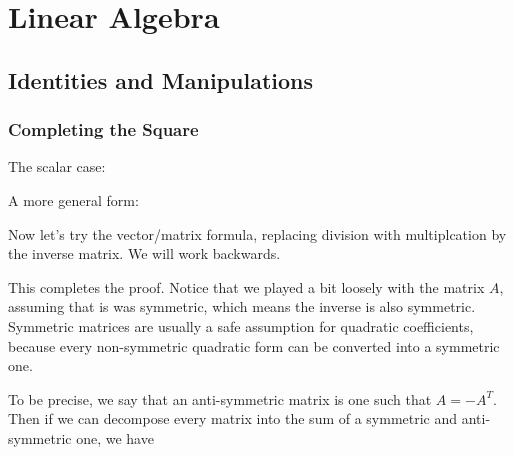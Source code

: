 \documentclass[12pt]{article}
\begin{document}
\section{Linear Algebra}
\subsection{Identities and Manipulations}

\subsubsection{Completing the Square}

The scalar case:

A more general form:

Now let's try the vector/matrix formula, replacing division with multiplcation by the inverse matrix. We will work backwards.


This completes the proof. Notice that we played a bit loosely with the matrix $A$, assuming that is was symmetric, which means the inverse is also symmetric. Symmetric matrices are usually a safe assumption for quadratic coefficients, because every non-symmetric quadratic form can be converted into a symmetric one.

To be precise, we say that an anti-symmetric matrix is one such that $A = -A^T$. Then if we can decompose every matrix into the sum of a symmetric and anti-symmetric one, we have

\end{document}
